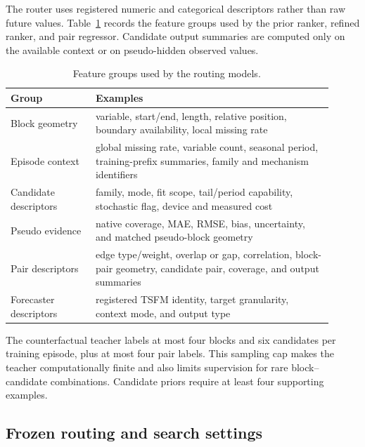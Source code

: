The router uses registered numeric and categorical descriptors rather than raw future values. Table~\ref{tab:feature-groups} records the feature groups used by the prior ranker, refined ranker, and pair regressor. Candidate output summaries are computed only on the available context or on pseudo-hidden observed values.

\begin{table}[h]
\centering
\small
\caption{Feature groups used by the routing models.}
\label{tab:feature-groups}
\begin{tabular}{p{0.24\linewidth}p{0.67\linewidth}}
\toprule
Group & Examples \\
\midrule
Block geometry & variable, start/end, length, relative position, boundary availability, local missing rate \\
Episode context & global missing rate, variable count, seasonal period, training-prefix summaries, family and mechanism identifiers \\
Candidate descriptors & family, mode, fit scope, tail/period capability, stochastic flag, device and measured cost \\
Pseudo evidence & native coverage, MAE, RMSE, bias, uncertainty, and matched pseudo-block geometry \\
Pair descriptors & edge type/weight, overlap or gap, correlation, block-pair geometry, candidate pair, coverage, and output summaries \\
Forecaster descriptors & registered TSFM identity, target granularity, context mode, and output type \\
\bottomrule
\end{tabular}
\end{table}

The counterfactual teacher labels at most four blocks and six candidates per training episode, plus at most four pair labels. This sampling cap makes the teacher computationally finite and also limits supervision for rare block--candidate combinations. Candidate priors require at least four supporting examples.

\subsection{Frozen routing and search settings}

